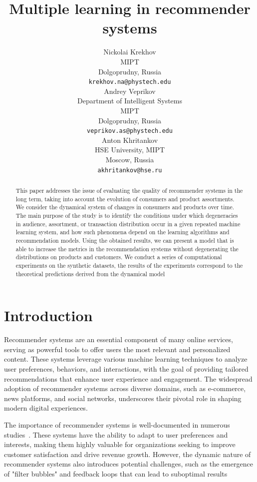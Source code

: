 \documentclass{article}
\title{Multiple learning in recommender systems}
\author{
	Nickolai Krekhov \\
	MIPT \\
        Dolgoprudny, Russia \\
        \texttt{krekhov.na@phystech.edu} \\
	\And
	Andrey Veprikov \\
	Department of Intelligent Systems
            \\MIPT\\Dolgoprudny, Russia\\\texttt{veprikov.as@phystech.edu}\\
	\And
	Anton Khritankov \\
        HSE University, MIPT\\
	Moscow, Russia\\
        \texttt{akhritankov@hse.ru}
}
\date{}
\begin{document}
\maketitle

\begin{abstract}
        This paper addresses the issue of evaluating the quality of recommender systems in the long term, taking into account the evolution of consumers and product assortments. We consider the dynamical system of changes in consumers and products over time. The main purpose of the study is to identify the conditions under which degeneracies in audience, assortment, or transaction distribution occur in a given repeated machine learning system, and how such phenomena depend on the learning algorithms and recommendation models. Using the obtained results, we can present a model that is able to increase the metrics in the recommendation systems without degenerating the distributions on products and customers. We conduct a series of computational experiments on the synthetic datasets, the results of the experiments correspond to the theoretical predictions derived from the dynamical model
\end{abstract}



\section{Introduction}

Recommender systems are an essential component of many online services, serving as powerful tools to offer users the most relevant and personalized content. These systems leverage various machine learning techniques to analyze user preferences, behaviors, and interactions, with the goal of providing tailored recommendations that enhance user experience and engagement. The widespread adoption of recommender systems across diverse domains, such as e-commerce, news platforms, and social networks, underscores their pivotal role in shaping modern digital experiences.

The importance of recommender systems is well-documented in numerous studies~\cite{UserModeling, EuropeanParliament}. These systems have the ability to adapt to user preferences and interests, making them highly valuable for organizations seeking to improve customer satisfaction and drive revenue growth. However, the dynamic nature of recommender systems also introduces potential challenges, such as the emergence of "filter bubbles" and feedback loops that can lead to suboptimal results~\cite{DominicSpohr, krauth2022breaking}
\end{document}
